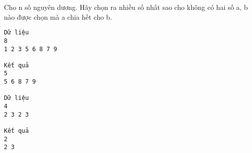 Cho n số nguyên dương. Hãy chọn ra nhiều số nhất sao cho không có hai số a, b nào được chọn mà a chia hết cho b.
\begin{verbatim}
Dữ liệu
8
1 2 3 5 6 8 7 9

Kết quả
5
5 6 8 7 9

Dữ liệu
4
2 3 2 3

Kết quả
2
2 3
\end{verbatim}